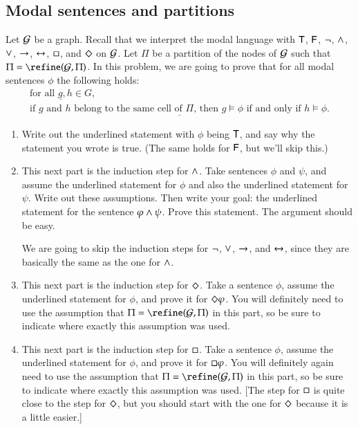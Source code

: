 \documentclass[12pt]{article}
\begin{document}
\subsection{Modal sentences and partitions}\label{fixedpointimpliesequivalence}
Let ${\cal G}$ be a graph.   Recall that we interpret the modal language with ${\sf T}$, ${\sf F}$, $\neg$, $\wedge$, $\vee$, $\rightarrow$, $\leftrightarrow$, $\Box$, and $\Diamond$ on ${\cal G}$.
Let $\Pi$ be a partition  of the nodes of ${\cal G}$ such that 
$\Pi = \refine(\GG,\Pi)$.   In this problem, we are going to prove that
for all modal sentences $\phi$ the following holds:
\[\begin{array}{l}
\underline{\mbox{for all $g, h\in G$}},\\
\underline{\mbox{if $g$ and $h$ belong to the same cell of $\Pi$,
then $g\models\phi$ if and only if $h\models\phi$.}}
\end{array}
\]
\begin{enumerate}
\item Write out the underlined statement with $\phi$ being ${\sf T}$, and say why the statement you wrote is true.
(The same holds for ${\sf F}$, but we'll skip this.)
\item  This next part is the induction step for $\wedge$.
Take   sentences $\phi$ and $\psi$, and  assume the underlined statement for $\phi$ and also the underlined statement for $\psi$.
Write out these assumptions.   Then write your goal: the underlined statement for the sentence $\varphi\wedge\psi$.
Prove this statement.   The argument should be easy.

We are going to skip the induction steps for $\neg$, $\vee$, $\rightarrow$, and $\leftrightarrow$, since they are basically the same as the one for $\wedge$.
\item This next part is the induction step for $\Diamond$.
Take a  sentence  $\phi$,   assume the underlined statement for $\phi$, and prove it for $\Diamond\varphi$.
You will definitely need to use the assumption that $\Pi = \refine(\GG,\Pi)$ in this part, so be sure to indicate where exactly this assumption was used.
\item This next part is the induction step for $\Box$.
Take a  sentence  $\phi$,   assume the underlined statement for $\phi$, and prove it for $\Box\varphi$.
You will definitely again need to use the assumption that $\Pi = \refine(\GG,\Pi)$ in this part, so be sure to indicate where exactly this assumption was used.
[The step  for $\Box$ is quite close to the step for $\Diamond$, but you should start with the one for $\Diamond$ because it is a little easier.]
\end{enumerate}
\end{document}
